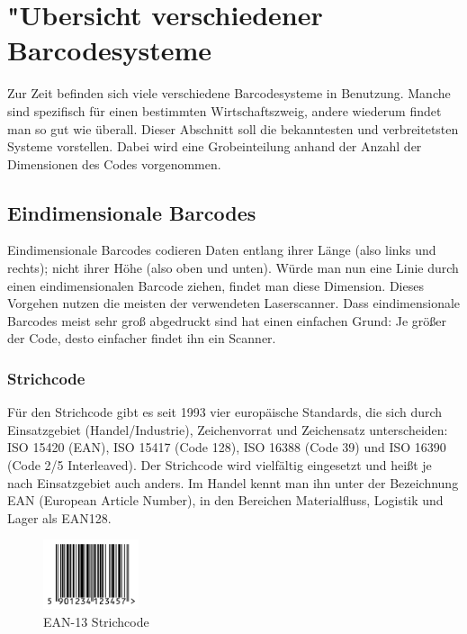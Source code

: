 \section{"Ubersicht verschiedener Barcodesysteme}
Zur Zeit befinden sich viele verschiedene Barcodesysteme in Benutzung. Manche sind spezifisch für einen bestimmten Wirtschaftszweig, andere wiederum findet man so gut wie überall. Dieser Abschnitt soll die bekanntesten und verbreitetsten Systeme vorstellen. Dabei wird eine Grobeinteilung anhand der Anzahl der Dimensionen des Codes vorgenommen.

\subsection{Eindimensionale Barcodes}
Eindimensionale Barcodes codieren Daten entlang ihrer Länge (also links und rechts); nicht ihrer Höhe (also oben und unten). Würde man nun eine Linie durch einen eindimensionalen Barcode ziehen, findet man diese Dimension. Dieses Vorgehen nutzen die meisten der verwendeten Laserscanner. Dass eindimensionale Barcodes meist sehr groß abgedruckt sind hat einen einfachen Grund: Je größer der Code, desto einfacher findet ihn ein Scanner.

\subsubsection{Strichcode}
Für den Strichcode gibt es seit 1993 vier europäische Standards, die sich durch Einsatzgebiet (Handel/Industrie), Zeichenvorrat und Zeichensatz unterscheiden: ISO 15420 (EAN), ISO 15417 (Code 128), ISO 16388 (Code 39) und ISO 16390 (Code 2/5 Interleaved).
Der Strichcode wird vielfältig eingesetzt und heißt je nach Einsatzgebiet auch anders. Im Handel kennt man ihn unter der Bezeichnung EAN (European Article Number), in den Bereichen Materialfluss, Logistik und Lager als EAN128.
\begin{figure}[htbp]%
	\centering
	\includegraphics[width=0.25\textwidth]{Bilder/EAN_13.png}
	\caption[EAN-13 Strichcode]{EAN-13 Strichcode\footnotemark}
	\label{barcode}
\end{figure}
\pagebreak
